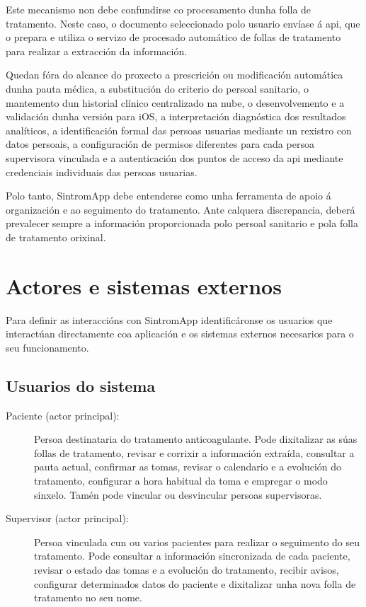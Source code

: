 Este mecanismo non debe confundirse co procesamento dunha folla de tratamento. Neste caso, o documento seleccionado polo usuario envíase á \gls{api}, que o prepara e utiliza o servizo de procesado automático de follas de tratamento para realizar a extracción da información.

Quedan fóra do alcance do proxecto a prescrición ou modificación automática dunha pauta médica, a substitución do criterio do persoal sanitario, o mantemento dun historial clínico centralizado na nube, o desenvolvemento e a validación dunha versión para iOS, a interpretación diagnóstica dos resultados analíticos, a identificación formal das persoas usuarias mediante un rexistro con datos persoais, a configuración de permisos diferentes para cada persoa supervisora vinculada e a autenticación dos puntos de acceso da \gls{api} mediante credenciais individuais das persoas usuarias.

Polo tanto, SintromApp debe entenderse como unha ferramenta de apoio á organización e ao seguimento do tratamento. Ante calquera discrepancia, deberá prevalecer sempre a información proporcionada polo persoal sanitario e pola folla de tratamento orixinal.

\section{Actores e sistemas externos}
\label{sec:actores}

Para definir as interaccións con SintromApp identificáronse os usuarios que interactúan directamente coa aplicación e os sistemas externos necesarios para o seu funcionamento.

\subsection*{Usuarios do sistema}

\begin{description}
\item[Paciente (actor principal):] Persoa destinataria do tratamento anticoagulante. Pode dixitalizar as súas follas de tratamento, revisar e corrixir a información extraída, consultar a pauta actual, confirmar as tomas, revisar o calendario e a evolución do tratamento, configurar a hora habitual da toma e empregar o modo sinxelo. Tamén pode vincular ou desvincular persoas supervisoras.


\item[Supervisor (actor principal):] Persoa vinculada cun ou varios pacientes para realizar o seguimento do seu tratamento. Pode consultar a información sincronizada de cada paciente, revisar o estado das tomas e a evolución do tratamento, recibir avisos, configurar determinados datos do paciente e dixitalizar unha nova folla de tratamento no seu nome.


\end{description}

